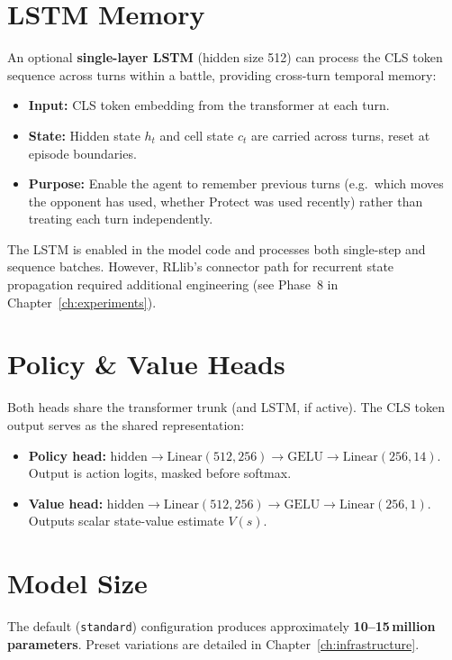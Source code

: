 \section{LSTM Memory}

An optional \textbf{single-layer LSTM} (hidden size 512) can process the CLS
token sequence across turns within a battle, providing cross-turn temporal
memory:

\begin{itemize}
  \item \textbf{Input:} CLS token embedding from the transformer at each turn.
  \item \textbf{State:} Hidden state $h_t$ and cell state $c_t$ are carried
        across turns, reset at episode boundaries.
  \item \textbf{Purpose:} Enable the agent to remember previous turns (e.g.\
        which moves the opponent has used, whether Protect was used recently)
        rather than treating each turn independently.
\end{itemize}

The LSTM is enabled in the model code and processes both single-step and
sequence batches.  However, RLlib's connector path for recurrent state
propagation required additional engineering (see Phase~8 in
Chapter~\ref{ch:experiments}).

\section{Policy \& Value Heads}

Both heads share the transformer trunk (and LSTM, if active).  The CLS token
output serves as the shared representation:

\begin{itemize}
  \item \textbf{Policy head:} $\text{hidden} \to \text{Linear}(512, 256) \to
        \text{GELU} \to \text{Linear}(256, 14)$.  Output is action logits,
        masked before softmax.
  \item \textbf{Value head:} $\text{hidden} \to \text{Linear}(512, 256) \to
        \text{GELU} \to \text{Linear}(256, 1)$.  Outputs scalar state-value
        estimate $V(s)$.
\end{itemize}

\section{Model Size}

The default (\texttt{standard}) configuration produces approximately
\textbf{10--15\,million parameters}.  Preset variations are detailed in
Chapter~\ref{ch:infrastructure}.

